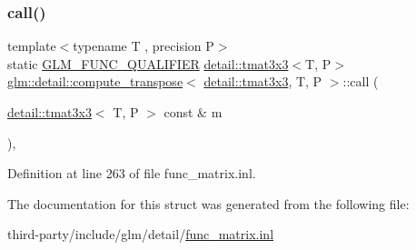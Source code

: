 \subsubsection{\texorpdfstring{call()}{call()}}
{\footnotesize\ttfamily template$<$typename T , precision P$>$ \\
static \hyperlink{setup_8hpp_a33fdea6f91c5f834105f7415e2a64407}{G\+L\+M\+\_\+\+F\+U\+N\+C\+\_\+\+Q\+U\+A\+L\+I\+F\+I\+ER} \hyperlink{structglm_1_1detail_1_1tmat3x3}{detail\+::tmat3x3}$<$T, P$>$ \hyperlink{structglm_1_1detail_1_1compute__transpose}{glm\+::detail\+::compute\+\_\+transpose}$<$ \hyperlink{structglm_1_1detail_1_1tmat3x3}{detail\+::tmat3x3}, T, P $>$\+::call (\begin{DoxyParamCaption}\item[{\hyperlink{structglm_1_1detail_1_1tmat3x3}{detail\+::tmat3x3}$<$ T, P $>$ const \&}]{m }\end{DoxyParamCaption})\hspace{0.3cm}{\ttfamily [inline]}, {\ttfamily [static]}}



Definition at line 263 of file func\+\_\+matrix.\+inl.



The documentation for this struct was generated from the following file\+:\begin{DoxyCompactItemize}
\item 
third-\/party/include/glm/detail/\hyperlink{func__matrix_8inl}{func\+\_\+matrix.\+inl}\end{DoxyCompactItemize}
